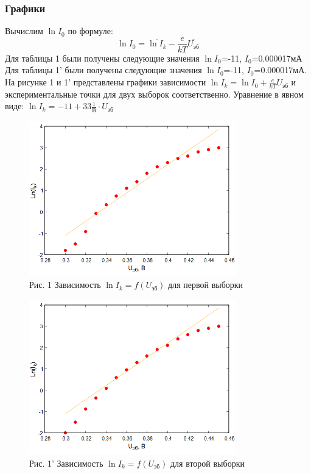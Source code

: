 \subsubsection{Графики}
Вычислим $\ln I_0$ по формуле:
\begin{equation}
\label{eq:12}
    \ln I_0=\overline{\ln I_k}-\frac{e}{kT}\overline{U_{\text{эб}}}
\end{equation}
Для таблицы 1 были получены следующие значения $\ln I_0$=-11, $I_0$=0.000017мА
Для таблицы 1' были получены следующие значения $\ln I_0$=-11, $I_0$=0.000017мА.
На рисунке 1 и 1' представлены графики зависимости $\ln I_k=\ln I_0+\frac{e}{kT}U_{\text{эб}}$ и экспериментальные точки для двух выборок соответственно. 
Уравнение в явном виде: $\ln I_k=-11+33\frac{1}{\text{В}}\cdot U_{\text{эб}}$
\begin{figure}[H]
\centering
\includegraphics[width=0.8\textwidth]{График 1.png}
\caption*{Рис. 1 Зависимость $\ln I_k=f(U_{\text{эб}})$ для первой выборки }
\label{fig:gist}
\end{figure}
\begin{figure}[H]
\centering
\includegraphics[width=0.8\textwidth]{График 2.png}
\caption*{Рис. 1' Зависимость $\ln I_k=f(U_{\text{эб}})$ для второй выборки}
\label{fig:gist}
\end{figure}
